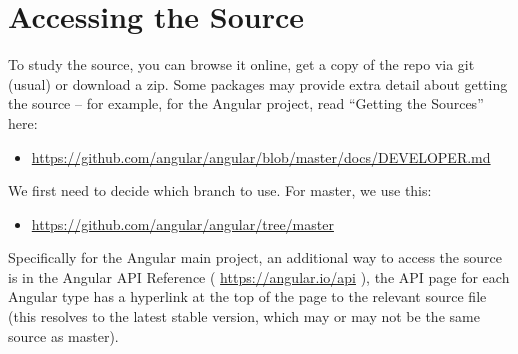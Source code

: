 \section{Accessing the Source}

To study the source, you can browse it online, get a copy of the repo via git (usual) or
download a zip. Some packages may provide extra detail about getting the source –
for example, for the Angular project, read “Getting the Sources” here:

\begin{itemize}
  \item \url{https://github.com/angular/angular/blob/master/docs/DEVELOPER.md}
\end{itemize}

We first need to decide which branch to use. For master, we use this:

\begin{itemize}
  \item \url{https://github.com/angular/angular/tree/master}
\end{itemize}

Specifically for the Angular main project, an additional way to access the source is in
the Angular API Reference (
\url{https://angular.io/api}
), the API page for each Angular
type has a hyperlink at the top of the page to the relevant source file (this resolves to
the latest stable version, which may or may not be the same source as master).
